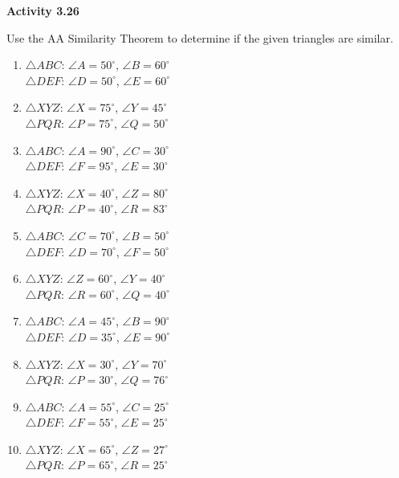 \vspace{0.3ex}
\noindent\textbf{Activity 3.26}

\vspace{0.2ex}

Use the AA Similarity Theorem to determine if the given triangles are similar. 
\begin{multicols}{2}				

\begin{enumerate}[label=\color{blue}\arabic*.]
    \item \(\triangle ABC\): \(\angle A = 50^\circ\), \(\angle B = 60^\circ\) \\
          \(\triangle DEF\): \(\angle D = 50^\circ\), \(\angle E = 60^\circ\)
    \item \(\triangle XYZ\): \(\angle X = 75^\circ\), \(\angle Y = 45^\circ\) \\
          \(\triangle PQR\): \(\angle P = 75^\circ\), \(\angle Q = 50^\circ\)
    \item \(\triangle ABC\): \(\angle A = 90^\circ\), \(\angle C = 30^\circ\) \\
          \(\triangle DEF\): \(\angle F = 95^\circ\), \(\angle E = 30^\circ\)
    \item \(\triangle XYZ\): \(\angle X = 40^\circ\), \(\angle Z = 80^\circ\) \\
          \(\triangle PQR\): \(\angle P = 40^\circ\), \(\angle R = 83^\circ\)
    \item \(\triangle ABC\): \(\angle C = 70^\circ\), \(\angle B = 50^\circ\) \\
          \(\triangle DEF\): \(\angle D = 70^\circ\), \(\angle F = 50^\circ\)
    \item \(\triangle XYZ\): \(\angle Z = 60^\circ\), \(\angle Y = 40^\circ\) \\
          \(\triangle PQR\): \(\angle R = 60^\circ\), \(\angle Q = 40^\circ\)
    \item \(\triangle ABC\): \(\angle A = 45^\circ\), \(\angle B = 90^\circ\) \\
          \(\triangle DEF\): \(\angle D = 35^\circ\), \(\angle E = 90^\circ\)
    \item \(\triangle XYZ\): \(\angle X = 30^\circ\), \(\angle Y = 70^\circ\) \\
          \(\triangle PQR\): \(\angle P = 30^\circ\), \(\angle Q = 76^\circ\)
    \item \(\triangle ABC\): \(\angle A = 55^\circ\), \(\angle C = 25^\circ\) \\
          \(\triangle DEF\): \(\angle F = 55^\circ\), \(\angle E = 25^\circ\)
    \item \(\triangle XYZ\): \(\angle X = 65^\circ\), \(\angle Z = 27^\circ\) \\
          \(\triangle PQR\): \(\angle P = 65^\circ\), \(\angle R = 25^\circ\)
\end{enumerate}
  
\end{multicols}
